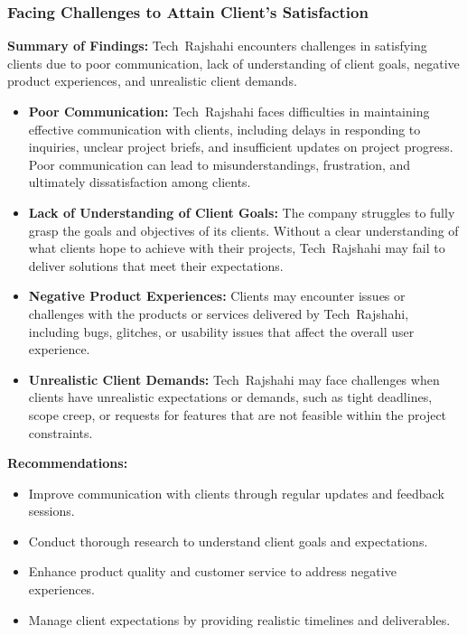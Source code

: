 \documentclass[12pt,a4paper]{article}
\begin{document}
\subsubsection{Facing Challenges to Attain Client’s Satisfaction}
\textbf{Summary of Findings:} Tech Rajshahi encounters challenges in satisfying clients due to poor communication, lack of understanding of client goals, negative product experiences, and unrealistic client demands.
\begin{itemize}
    \item \textbf{Poor Communication:} Tech Rajshahi faces difficulties in maintaining effective communication with clients, including delays in responding to inquiries, unclear project briefs, and insufficient updates on project progress.  Poor communication can lead to misunderstandings, frustration, and ultimately dissatisfaction among clients.
    \item \textbf{Lack of Understanding of Client Goals:} The company struggles to fully grasp the goals and objectives of its clients.  Without a clear understanding of what clients hope to achieve with their projects, Tech Rajshahi may fail to deliver solutions that meet their expectations.
    \item \textbf{Negative Product Experiences:} Clients may encounter issues or challenges with the products or services delivered by Tech Rajshahi, including bugs, glitches, or usability issues that affect the overall user experience.
    \item \textbf{Unrealistic Client Demands:} Tech Rajshahi may face challenges when clients have unrealistic expectations or demands, such as tight deadlines, scope creep, or requests for features that are not feasible within the project constraints.
\end{itemize}
\textbf{Recommendations:}
\begin{itemize}
    \item Improve communication with clients through regular updates and feedback sessions.
    \item Conduct thorough research to understand client goals and expectations.
    \item Enhance product quality and customer service to address negative experiences.
    \item Manage client expectations by providing realistic timelines and deliverables.
\end{itemize}
\end{document}
